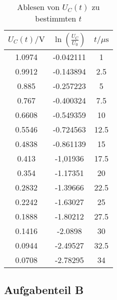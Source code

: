 \begin{table}
	\centering
	\caption{Ablesen von $U_{C}(t)$ zu bestimmten $t$}
	\begin{tabular}{c c c}
	  \toprule
	  $U_C(t)/\unit{\volt}$ & $\ln{\left(\frac{U_C}{U_0}\right)}$ & $t/\mu \unit{\second}$ \\
	  \midrule
	  1.0974   &   -0.042111   &   1   \\
	  0.9912   &   -0.143894   &   2.5  \\
	  0.885    &   -0.257223   &   5   \\
	  0.767    &   -0.400324   &   7.5  \\
	  0.6608   &   -0.549359   &   10    \\
	  0.5546   &   -0.724563   &   12.5  \\
	  0.4838   &   -0.861139   &   15   \\
	  0.413    &   -1,01936    &   17.5  \\
	  0.354    &   -1.17351    &   20    \\
	  0.2832   &   -1.39666    &   22.5  \\
	  0.2242   &   -1.63027    &   25   \\
	  0.1888   &   -1.80212    &   27.5  \\
	  0.1416   &   -2.0898     &   30    \\
	  0.0944   &   -2.49527    &   32.5  \\
	  0.0708   &   -2.78295    &   34   \\
	  \bottomrule
	\end{tabular}
  \end{table}

\subsection{Aufgabenteil B}

